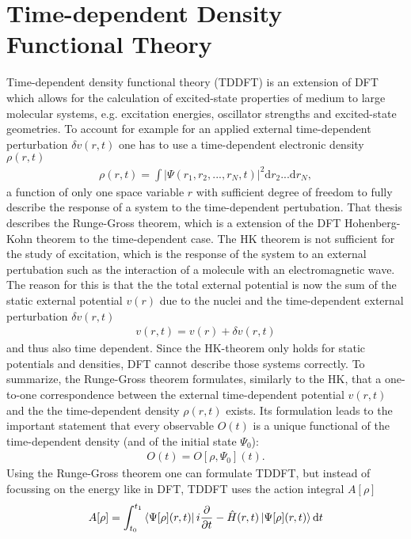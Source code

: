 
\section{Time-dependent Density Functional Theory}
Time-dependent density functional theory (TDDFT) is an extension of DFT which allows for the calculation of excited-state properties of medium to large molecular systems, e.g. excitation energies, oscillator strengths and excited-state geometries.\cite{TDDFT} To account for example for an applied external time-dependent perturbation $δv(r, t)$ one has to use a time-dependent electronic density $\rho(r, t)$
\begin{align}
    \rho(r, t) = \int |\Psi(r_1, r_2, ..., r_N, t)|^2 \mathrm{d}r_2...\mathrm{d}r_N \mathrm{ ,}
\end{align}
a function of only one space variable $r$ with sufficient degree of freedom to fully describe the response of a system to the time-dependent pertubation. That thesis describes the Runge-Gross theorem\cite{Runge-Gross}, which is a extension of the DFT Hohenberg-Kohn theorem to the time-dependent case. The HK theorem is not sufficient for the study of excitation, which is the response of the system to an external pertubation such as the interaction of a molecule with an electromagnetic wave. The reason for this is that the the total external potential is now the sum of the static external potential $v(r)$ due to the nuclei and the time-dependent external perturbation $\delta v(r, t)$ 
\begin{align}
    v(r, t) = v(r) + \delta v(r, t)
\end{align}
and thus also time dependent. Since the HK-theorem only holds for static potentials and densities, DFT cannot describe those systems correctly. To summarize, the Runge-Gross theorem formulates, similarly to the HK, that a one-to-one correspondence between the external time-dependent potential $v(r, t)$ and the the time-dependent density $\rho(r, t)$ exists. Its formulation leads to the important statement that every observable $O(t)$ is a unique functional of the time-dependent density (and of the initial state $\Psi_0$): 
\begin{align}
    O(t) = O[\rho, \Psi_0](t).
\end{align}
Using the Runge-Gross theorem one can formulate TDDFT, but instead of focussing on the energy like in DFT, TDDFT uses the action integral $A[\rho]$
\begin{align}
    A[\rho] = \int_{t_0}^{t_1}\bra{\Psi[\rho](r, t)}i\frac{\partial}{\partial t} - \hat{H}(r, t) \ket{\Psi[\rho](r, t)}\mathrm{d}t
\end{align}
